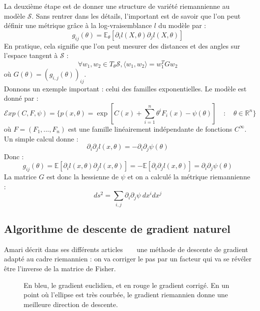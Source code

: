 \documentclass{article}
\theoremstyle{definition}
\newcommand{\R}{\mathbb R}
\begin{document}
La deuxième étape est de donner une structure de variété riemannienne au modèle $\mathcal S$. Sans rentrer dans les détails, l'important est de savoir que l'on peut définir une métrique grâce à la log-vraisemblance $l$ du modèle par :
\[g_{ij} (\theta) = \mathbb E_\theta[\partial_i l(X,\theta) \partial_j l(X,\theta)]\]
En pratique, cela signifie que l'on peut mesurer des distances et des angles sur l'espace tangent à $\mathcal S$ : 
\[\forall w_1,w_2 \in T_\theta \mathcal S, \langle w_1 , w_2 \rangle = w_1^T G w_2\] où $G(\theta)=(g_{i,j}(\theta))_{ij}$.\\

Donnons un exemple important : celui des familles exponentielles. Le modèle est donné par :
\[\mathcal{E}xp(C,F,\psi) = \{p(x,\theta)=\exp[C(x)+\sum_{i=1}^n \theta^i F_i(x) -\psi(\theta)] \quad :\quad  \theta \in \R^n\}\]
où $F=(F_1,...,F_n)$ est une famille linéairement indépendante de fonctions $C^\infty$. Un simple calcul donne :
\[\partial_i \partial_j l(x,\theta) =-\partial_i \partial_j \psi(\theta)\]
Donc :
\[g_{ij}(\theta) =\mathbb E[\partial_i l(x,\theta)\partial_j l(x,\theta)]=-\mathbb E[\partial_i\partial_j l(x,\theta)]=\partial_i \partial_j \psi(\theta)\]
La matrice $G$ est donc la hessienne de $\psi$ et on a calculé la métrique riemannienne :
\[ds^2= \sum_{i,j} \partial_i \partial_j \psi \ dx^i dx^j\]

\subsection{Algorithme de descente de gradient naturel}

\noindent Amari décrit dans ses différents articles ~\cite{Amari1994} ~\cite{Amari1998} une méthode de descente de gradient adapté au cadre riemannien : on va corriger le pas par un facteur qui va se révéler être l'inverse de la matrice de Fisher. %

\begin{figure}[h!]
\label{ellipse}
\caption{En bleu, le gradient euclidien, et en rouge le gradient corrigé. En un point où l'ellipse est très courbée, le gradient riemannien donne une meilleure direction de descente.}
\end{figure}
\end{document}
